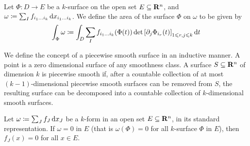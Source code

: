 \begin{definition}
\label{def:k-surface-area}
Let \(\Phi: D \to E\) be a \(k\)-surface on the open set \(E \subseteq \mathbf{R}^n\),
and \(\omega \coloneq \sum_I f_{i_1 \dots i_k}\, \mathrm{d} x_{i_1 \dots i_k}\). We
define the area of the surface \(\Phi\) on \(\omega\) to be given by
\[
  \int_{\Phi} \omega
  \coloneq \int_D \sum_I f_{i_1 \dots i_k}(\Phi(t))
  \det {\left[ \partial_j \Phi_{i_r}(t) \right]}_{1 \leqslant r, j \leqslant k}
  \, \mathrm{d} t
\]
\end{definition}

\begin{definition}
\label{def:piecewise-smooth-surface}
We define the concept of a piecewise smooth surface in an inductive manner. A
point is a zero dimensional surface of any smoothness class. A surface \(S
\subseteq \mathbf{R}^n\) of dimension \(k\) is piecewise smooth if, after a countable
collection of at most \((k-1)\)-dimensional piecewise smooth surfaces can be
removed from \(S\), the resulting surface can be decomposed into a countable
collection of \(k\)-dimensional smooth surfaces.
\end{definition}

\begin{theorem}
\label{thm:zero-form-standard-representation}
Let \(\omega \coloneq \sum_J f_J\, \mathrm{d} x_J\) be a \(k\)-form in an open set
\(E \subseteq \mathbf{R}^{n}\), in its standard representation. If \(\omega = 0\) in
\(E\) (that is \(\omega(\Phi) = 0\) for all \(k\)-surface \(\Phi\) in \(E\)),
then \(f_J(x) = 0\) for all \(x \in E\).
\end{theorem}

